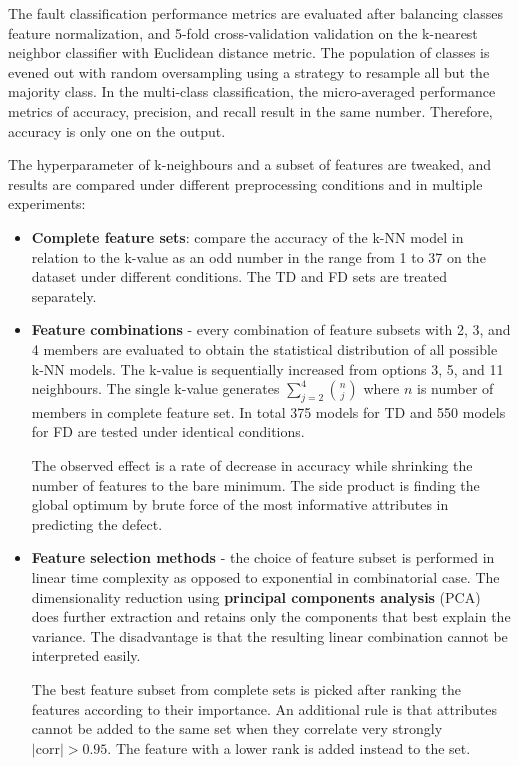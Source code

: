 The fault classification performance metrics are evaluated after balancing classes feature normalization, and 5-fold cross-validation validation on the k-nearest neighbor classifier with Euclidean distance metric. The population of classes is evened out with random oversampling using a strategy to resample all but the majority class. In the multi-class classification, the micro-averaged performance metrics of accuracy, precision, and recall result in the same number. Therefore, accuracy is only one on the output. 

The hyperparameter of k-neighbours and a subset of features are tweaked, and results are compared under different preprocessing conditions and in multiple experiments:

\begin{itemize}
\itemsep0pt
\item \textbf{Complete feature sets}: compare the accuracy of the k-NN model in relation to the k-value as an odd number in the range from 1 to 37 on the dataset under different conditions. The TD and FD sets are treated separately.

\item \textbf{Feature combinations} - every combination of feature subsets with 2, 3, and 4 members are evaluated to obtain the statistical distribution of all possible k-NN models. The k-value is sequentially increased from options 3, 5, and 11 neighbours. The single k-value generates $\sum_{j=2}^{4}{\binom{n}{j}}$ where $n$ is number of members in complete feature set. In total 375 models for TD and 550 models for FD are tested under identical conditions. 

The observed effect is a rate of decrease in accuracy while shrinking the number of features to the bare minimum. The side product is finding the global optimum by brute force of the most informative attributes in predicting the defect.

\item \textbf{Feature selection methods} - the choice of feature subset is performed in linear time complexity as opposed to exponential in combinatorial case. The dimensionality reduction using \textbf{principal components analysis} (PCA) does further extraction and retains only the components that best explain the variance. The disadvantage is that the resulting linear combination cannot be interpreted easily. 

The best feature subset from complete sets is picked after ranking the features according to their importance. An additional rule is that attributes cannot be added to the same set when they correlate very strongly  $|\mathrm{corr}| > 0.95$. The feature with a lower rank is added instead to the set.


\end{itemize}
